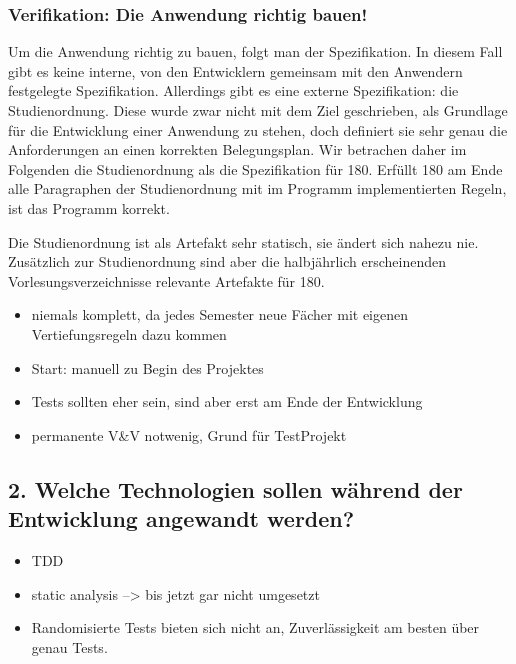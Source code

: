 \documentclass[ngerman]{article}
\begin{document}
\subsubsection{Verifikation: Die Anwendung richtig bauen!}

Um die Anwendung richtig zu bauen, folgt man der Spezifikation. In
diesem Fall gibt es keine interne, von den Entwicklern gemeinsam mit den
Anwendern festgelegte Spezifikation. Allerdings gibt es eine externe
Spezifikation: die Studienordnung. Diese wurde zwar nicht mit dem Ziel
geschrieben, als Grundlage für die Entwicklung einer Anwendung zu
stehen, doch definiert sie sehr genau die Anforderungen an einen
korrekten Belegungsplan. Wir betrachen daher im Folgenden die
Studienordnung als die Spezifikation für 180. Erfüllt 180 am Ende alle
Paragraphen der Studienordnung mit im Programm implementierten Regeln,
ist das Programm korrekt.

Die Studienordnung ist als Artefakt sehr statisch, sie ändert sich nahezu nie.
Zusätzlich zur Studienordnung sind aber die halbjährlich erscheinenden Vorlesungsverzeichnisse relevante Artefakte für 180.

\begin{itemize}
    \item
        niemals komplett, da jedes Semester neue Fächer mit eigenen Vertiefungsregeln dazu kommen 
    \item
        Start: manuell zu Begin des Projektes
    \item
        Tests sollten eher sein, sind aber erst am Ende der Entwicklung
    \item
        permanente V\&V notwenig, Grund für TestProjekt
\end{itemize}

\subsection{2. Welche Technologien sollen während der Entwicklung angewandt werden?}

\begin{itemize}
    \item
        TDD
    \item
        static analysis --\textgreater{} bis jetzt gar nicht umgesetzt
    \item
        Randomisierte Tests bieten sich nicht an, Zuverlässigkeit am besten über genau Tests.
\end{itemize}
\end{document}
